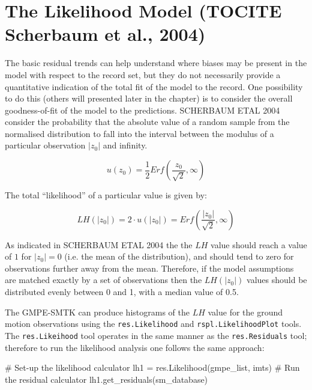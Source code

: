 \section{The Likelihood Model (TOCITE Scherbaum et al., 2004)}
\label{sec:lh_model}

The basic residual trends can help understand where biases may be present in the model with respect to the record set, but they do not necessarily provide a quantitative indication of the total fit of the model to the record. One possibility to do this (others will presented later in the chapter) is to consider the overall goodness-of-fit of the model to the predictions. SCHERBAUM ETAL 2004 consider the probability that the absolute value of a random sample from the normalised distribution to fall into the interval between the modulus of a particular observation $|z_0|$ and infinity.

\begin{equation}
u \left( {z_0} \right) = \frac{1}{2} Erf\left( {\frac{z_0}{\sqrt{2}}, \infty} \right)
\end{equation}

The total ``likelihood'' of a particular value is given by:

\begin{equation}
LH \left( {|z_0|} \right) = 2 \cdot u \left( {|z_0|} \right) = Erf \left( {\frac{|z_0|}{\sqrt{2}}, \infty} \right)
\end{equation}

As indicated in SCHERBAUM ETAL 2004 the the $LH$ value should reach a value of $1$ for $|z_0|=0$ (i.e. the mean of the distribution), and should tend to zero for observations further away from the mean. Therefore, if the model assumptions are matched exactly by a set of observations then the $LH \left( {|z_0|} \right)$ values should be distributed evenly between 0 and 1, with a median value of 0.5. 

The GMPE-SMTK can produce histograms of the $LH$ value for the ground motion observations using the \verb=res.Likelihood= and \verb=rspl.LikelihoodPlot= tools. The \verb=res.Likeihood= tool operates in the same manner as the \verb=res.Residuals= tool; therefore to run the likelihood analysis one follows the same approach:

\begin{python}[frame=single]
# Set-up the likelihood calculator
lh1 = res.Likelihood(gmpe_list, imts)
# Run the residual calculator
lh1.get_residuals(sm_database)
\end{python}

